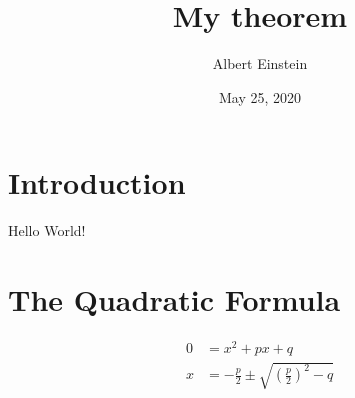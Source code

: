 \documentclass{article}
\begin{document}
\title{My theorem}
\author{Albert Einstein}
\date{May 25, 2020} %
\maketitle

\tableofcontents

\section{Introduction}
Hello World!

\section{The Quadratic Formula}

\begin{align}
  0 &= x^2 + px + q \\
  x &= -\frac{p}{2}\pm\sqrt{\left(\frac{p}{2}\right)^2 - q}
\end{align}
\end{document}
